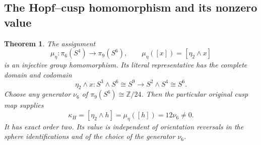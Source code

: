 \documentclass[11pt,letterpaper]{article}
\numberwithin{equation}{section}
\newtheorem{theorem}{Theorem}[section]
\theoremstyle{definition}
\theoremstyle{remark}
\begin{document}
\subsection{The Hopf--cusp homomorphism and its nonzero value}

\begin{theorem}
\label{hbridge:mu-theorem}
The assignment
\begin{equation}
\mu_\eta:\pi_6(S^4)\longrightarrow\pi_9(S^6),\qquad
\mu_\eta([x])=[\eta_2\wedge x]
\label{hbridge:eq:mu}
\end{equation}
is an injective group homomorphism. Its literal representative has
the complete domain and codomain
\[
\eta_2\wedge x:S^3\wedge S^6\cong S^9
\longrightarrow S^2\wedge S^4\cong S^6.
\]
Choose any generator \(\nu_6\) of
\(\pi_9(S^6)\cong\mathbb Z/24\). Then the particular original
cusp map supplies
\begin{equation}
\kappa_H=[\eta_2\wedge h]
=\mu_\eta([h])=12\nu_6\ne0.
\label{hbridge:eq:kappa}
\end{equation}
It has exact order two. Its value is independent of orientation
reversals in the sphere identifications and of the choice of the
generator \(\nu_6\).
\end{theorem}
\end{document}

